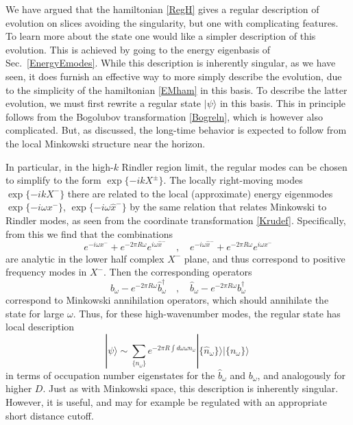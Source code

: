 \documentclass[12pt]{article}
\numberwithin{equation}{section}
\newcommand{\beq}{\begin{equation}}
\newcommand{\eeq}{\end{equation}}
\begin{document}
We have argued that the hamiltonian \eqref{RegH} gives a regular description of evolution on slices avoiding the singularity, but one with complicating features.  
To learn more about the state one would like a simpler description of this evolution.  This is achieved by going to the energy eigenbasis of Sec.~\ref{EnergyEmodes}. While this description is inherently singular, as we have seen, it does furnish an effective way to more simply describe the evolution, due to the simplicity of the hamiltonian  \eqref{EMham} in this basis.  To describe the latter evolution, we must first rewrite a regular state $|\psi\rangle$ in this basis.  This in principle follows from the Bogolubov transformation \eqref{Bogreln}, which is however also complicated.  But, as discussed, the long-time behavior is expected to follow from the local Minkowski structure near the horizon.


In particular, in the high-$k$  Rindler region limit, the regular modes can be chosen to simplify to the form $\exp\{-ikX^\pm\}$.  The locally right-moving modes $\exp\{-ikX^-\}$ there are related to the local (approximate) energy eigenmodes $\exp\{-i\omega x^-\}$, $\exp\{-i\omega \hat x^-\}$ by the same relation that relates Minkowski to Rindler modes, as seen from the coordinate transformation \eqref{Krudef}.  Specifically, from this we find that the combinations
\beq
e^{-i\omega x^-} + e^{-2\pi R\omega} e^{i\omega \hat x^-}\quad ,\quad e^{-i\omega \hat x^-} + e^{-2\pi R\omega} e^{i\omega  x^-}
\eeq
are analytic in the lower half complex $X^-$ plane, and thus correspond to positive frequency modes in $X^-$.  Then the corresponding operators
\beq
b_\omega - e^{-2\pi R\omega}\hat b^\dagger_\omega\quad,\quad \hat b_\omega - e^{-2\pi R\omega} b^\dagger_\omega
\eeq
correspond to Minkowski annihilation operators, which should annihilate the state for large $\omega$.  
Thus, for these high-wavenumber modes, the regular state has local description
\beq\label{statereln}
|\psi\rangle \sim\sum_{\{n_\omega\}} e^{-2\pi R\int d\omega \omega n_\omega }| \{\hat n_\omega\} \rangle |\{n_\omega\}\rangle\ 
\eeq
in terms of occupation number eigenstates for the $\hat b_\omega$ and $b_\omega$, and analogously for higher $D$.
Just as with Minkowski space, this description is inherently singular.  However, it is useful, and may for example be regulated with an appropriate short distance cutoff.
\end{document}
